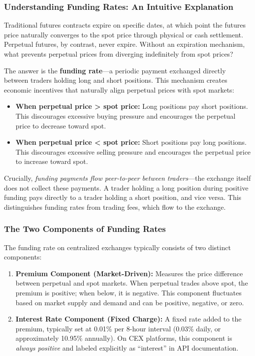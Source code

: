 \documentclass[10pt,twocolumn]{article}
\begin{document}
\subsubsection{Understanding Funding Rates: An Intuitive Explanation}

Traditional futures contracts expire on specific dates, at which point the futures price naturally converges to the spot price through physical or cash settlement. Perpetual futures, by contrast, never expire. Without an expiration mechanism, what prevents perpetual prices from diverging indefinitely from spot prices?

The answer is the \textbf{funding rate}---a periodic payment exchanged directly between traders holding long and short positions. This mechanism creates economic incentives that naturally align perpetual prices with spot markets:

\begin{itemize}
    \item \textbf{When perpetual price > spot price:} Long positions pay short positions. This discourages excessive buying pressure and encourages the perpetual price to decrease toward spot.
    \item \textbf{When perpetual price < spot price:} Short positions pay long positions. This discourages excessive selling pressure and encourages the perpetual price to increase toward spot.
\end{itemize}

Crucially, \textit{funding payments flow peer-to-peer between traders}---the exchange itself does not collect these payments. A trader holding a long position during positive funding pays directly to a trader holding a short position, and vice versa. This distinguishes funding rates from trading fees, which flow to the exchange.

\subsubsection{The Two Components of Funding Rates}

The funding rate on centralized exchanges typically consists of two distinct components:

\begin{enumerate}
    \item \textbf{Premium Component (Market-Driven):} Measures the price difference between perpetual and spot markets. When perpetual trades above spot, the premium is positive; when below, it is negative. This component fluctuates based on market supply and demand and can be positive, negative, or zero.

    \item \textbf{Interest Rate Component (Fixed Charge):} A fixed rate added to the premium, typically set at 0.01\% per 8-hour interval (0.03\% daily, or approximately 10.95\% annually). On CEX platforms, this component is \textit{always positive} and labeled explicitly as ``interest'' in API documentation.
\end{enumerate}
\end{document}
